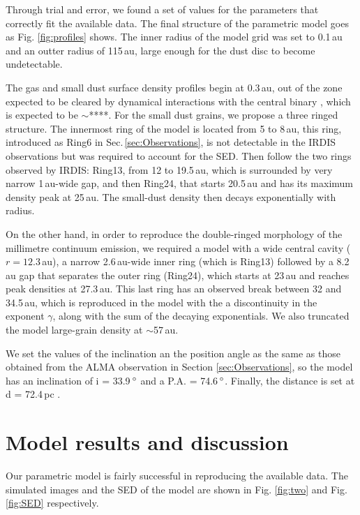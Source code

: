 \documentclass[letters,usenatbib,times]{mnras}
\begin{document}
Through trial and error, we found a set of values for the parameters that  correctly fit the available data. The final structure of the parametric model goes as Fig. \ref{fig:profiles} shows. The inner radius of the model grid was set to 0.1\,au and an outter radius of 115\,au, large enough for the dust disc to become undetectable.

The gas and small dust surface density profiles  begin at 0.3\,au, out of the zone expected to be cleared by dynamical interactions with the central binary \citep{Art_Lu}, which is expected to be $\sim$****. For the small dust grains, we propose a three ringed structure. The innermost ring of the model is located from 5 to 8\,au, this ring, introduced as Ring6 in Sec.\,\ref{sec:Observations}, is not detectable in the IRDIS  observations but was required to account for the  SED. Then follow the two  rings observed by IRDIS:  Ring13, from 12 to 19.5\,au, which is surrounded by very narrow  1\,au-wide gap, and then Ring24, that starts  20.5\,au and has its maximum density peak at 25\,au. The small-dust density  then decays exponentially with  radius.


On the other hand, in order to reproduce the double-ringed  morphology of the millimetre continuum emission,  we required a model with   a wide central cavity ($r = 12.3$\,au), a narrow 2.6\,au-wide inner ring (which is Ring13) followed by a 8.2\,au gap  that separates the  outer ring (Ring24), which starts at  23\,au and reaches peak  densities  at 27.3\,au. This last ring has an observed break between 32 and 34.5\,au, which is reproduced in the model with the a discontinuity in the exponent $\gamma$, along with the sum of the decaying exponentials. We also truncated  the model large-grain density at  $\sim$57\,au. 


We set the values of the inclination an the position angle as the same as those obtained from the ALMA observation in Section \ref{sec:Observations}, so the model has an inclination of i = 33.9\,$\hbox{$^\circ$}$ and a P.A. = 74.6\,$\hbox{$^\circ$}$. Finally, the distance is set at d = 72.4\,pc \citep{Gaia}.

\section{Model results and discussion} \label{sec:results}

Our parametric model is fairly successful in reproducing the available data. The simulated images and the SED of the model are shown in Fig. \ref{fig:two} and Fig. \ref{fig:SED} respectively.
\end{document}
